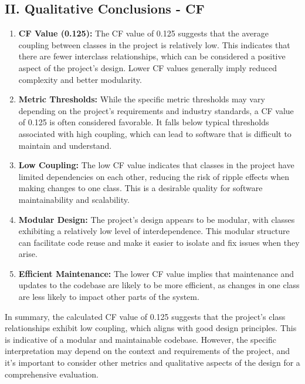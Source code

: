 \documentclass[english,12pt,a4paper]{report}
\begin{document}
	\subsection*{II. Qualitative Conclusions - CF}
	\begin{enumerate}
		\item \textbf{CF Value (0.125):} The CF value of 0.125 suggests that the average coupling between classes in the project is relatively low. This indicates that there are fewer interclass relationships, which can be considered a positive aspect of the project's design. Lower CF values generally imply reduced complexity and better modularity.
		\item \textbf{Metric Thresholds:} While the specific metric thresholds may vary depending on the project's requirements and industry standards, a CF value of 0.125 is often considered favorable. It falls below typical thresholds associated with high coupling, which can lead to software that is difficult to maintain and understand.
		\item \textbf{Low Coupling:} The low CF value indicates that classes in the project have limited dependencies on each other, reducing the risk of ripple effects when making changes to one class. This is a desirable quality for software maintainability and scalability.
		\item \textbf{Modular Design:} The project's design appears to be modular, with classes exhibiting a relatively low level of interdependence. This modular structure can facilitate code reuse and make it easier to isolate and fix issues when they arise.
		\item \textbf{Efficient Maintenance:} The lower CF value implies that maintenance and updates to the codebase are likely to be more efficient, as changes in one class are less likely to impact other parts of the system.
	
	\end{enumerate}
		In summary, the calculated CF value of 0.125 suggests that the project's class relationships exhibit low coupling, which aligns with good design principles. This is indicative of a modular and maintainable codebase. However, the specific interpretation may depend on the context and requirements of the project, and it's important to consider other metrics and qualitative aspects of the design for a comprehensive evaluation.
		
\end{document}

